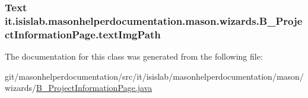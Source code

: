 \hypertarget{classit_1_1isislab_1_1masonhelperdocumentation_1_1mason_1_1wizards_1_1_b___project_information_page_a2d8d332de830585ce52efe2c43ff9e2b}{
\subsubsection[{text\-Img\-Path}]{\setlength{\rightskip}{0pt plus 5cm}Text it.\-isislab.\-masonhelperdocumentation.\-mason.\-wizards.\-B\-\_\-\-Project\-Information\-Page.\-text\-Img\-Path\hspace{0.3cm}{\ttfamily [private]}}}\label{classit_1_1isislab_1_1masonhelperdocumentation_1_1mason_1_1wizards_1_1_b___project_information_page_a2d8d332de830585ce52efe2c43ff9e2b}


The documentation for this class was generated from the following file\-:\begin{DoxyCompactItemize}
\item 
git/masonhelperdocumentation/src/it/isislab/masonhelperdocumentation/mason/wizards/\hyperlink{_b___project_information_page_8java}{B\-\_\-\-Project\-Information\-Page.\-java}\end{DoxyCompactItemize}

